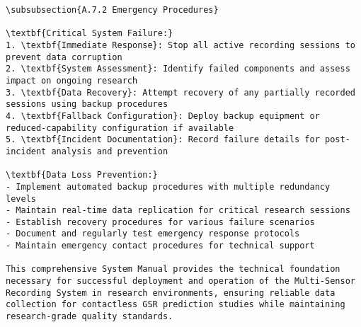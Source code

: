 \begin{verbatim}
\subsubsection{A.7.2 Emergency Procedures}

\textbf{Critical System Failure:}
1. \textbf{Immediate Response}: Stop all active recording sessions to prevent data corruption
2. \textbf{System Assessment}: Identify failed components and assess impact on ongoing research
3. \textbf{Data Recovery}: Attempt recovery of any partially recorded sessions using backup procedures
4. \textbf{Fallback Configuration}: Deploy backup equipment or reduced-capability configuration if available
5. \textbf{Incident Documentation}: Record failure details for post-incident analysis and prevention

\textbf{Data Loss Prevention:}
- Implement automated backup procedures with multiple redundancy levels
- Maintain real-time data replication for critical research sessions
- Establish recovery procedures for various failure scenarios
- Document and regularly test emergency response protocols
- Maintain emergency contact procedures for technical support

This comprehensive System Manual provides the technical foundation necessary for successful deployment and operation of the Multi-Sensor Recording System in research environments, ensuring reliable data collection for contactless GSR prediction studies while maintaining research-grade quality standards.
\end{verbatim}
